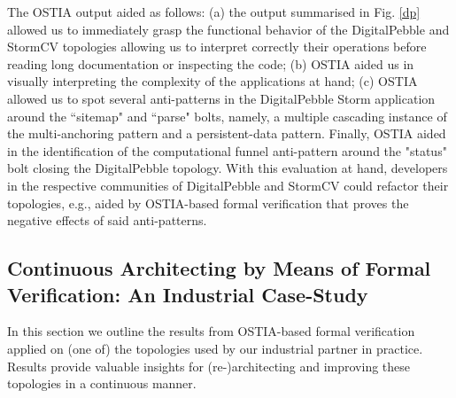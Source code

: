 The OSTIA output aided as follows: (a) the output summarised in Fig. \ref{dp}
allowed us to immediately grasp the functional behavior of the DigitalPebble and
StormCV topologies allowing us to interpret correctly their operations before
reading long documentation or inspecting the code; (b) OSTIA aided us in visually interpreting the complexity of the applications at hand; (c) OSTIA allowed us to spot several anti-patterns in the DigitalPebble Storm application around the ``sitemap" and ``parse" bolts, namely, a multiple cascading instance of the multi-anchoring pattern and a persistent-data pattern. Finally, OSTIA aided in the identification of the computational funnel anti-pattern around the "status" bolt closing the DigitalPebble topology. With this evaluation at hand, developers in the respective communities of DigitalPebble and StormCV could refactor their topologies, e.g., aided by OSTIA-based formal verification that proves the negative effects of said anti-patterns.

%

\subsection{Continuous Architecting by Means of Formal Verification: An Industrial Case-Study}

In this section we outline the results from OSTIA-based formal verification applied on (one of) the topologies used by our industrial partner in practice. Results provide valuable insights for (re-)architecting and improving these topologies in a continuous manner.


